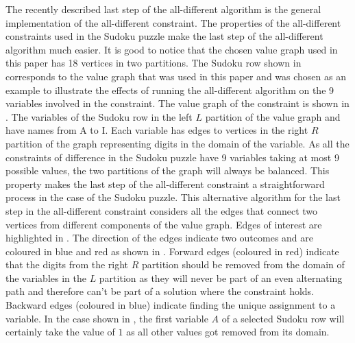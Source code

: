 \documentclass{l4proj}
\begin{document}
\noindent The recently described last step of the all-different algorithm is the general implementation of the all-different constraint. The properties of the all-different constraints used in the Sudoku puzzle make the last step of the all-different algorithm much easier. It is good to notice that the chosen value graph used in this paper has 18 vertices in two partitions. The Sudoku row shown in  corresponds to the value graph that was used in this paper and was chosen as an example to illustrate the effects of running the all-different algorithm on the 9 variables involved in the constraint. The value graph of the constraint is shown in . The variables of the Sudoku row in the left $L$ partition of the value graph and have names from A to I. Each variable has edges to vertices in the right $R$ partition of the graph representing digits in the domain of the variable. As all the constraints of difference in the Sudoku puzzle have 9 variables taking at most 9 possible values, the two partitions of the graph will always be balanced. This property makes the last step of the all-different constraint a straightforward process in the case of the Sudoku puzzle. This alternative algorithm for the last step in the all-different constraint considers all the edges that connect two vertices from different components of the value graph. Edges of interest are highlighted in . The direction of the edges indicate two outcomes and are coloured in blue and red as shown in . Forward edges (coloured in red) indicate that the digits from the right $R$ partition should be removed from the domain of the variables in the $L$ partition as they will never be part of an even alternating path and therefore can't be part of a solution where the constraint holds. Backward edges (coloured in blue) indicate finding the unique assignment to a variable. In the case shown in , the first variable $A$ of a selected Sudoku row will certainly take the value of $1$ as all other values got removed from its domain.
\end{document}
